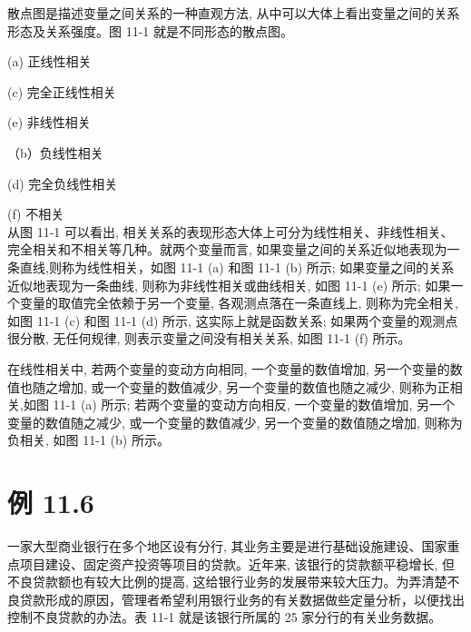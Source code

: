 \documentclass[10pt]{article}
\begin{document}
\begin{CJK*}{UTF8}{bsmi}
散点图是描述变量之间关系的一种直观方法, 从中可以大体上看出变量之间的关系形态及关系强度。图 11-1 就是不同形态的散点图。

\begin{center}
\end{center}

(a) 正线性相关

\begin{center}
\end{center}

(c) 完全正线性相关

\begin{center}
\end{center}

(e) 非线性相关

\begin{center}
\end{center}

（b）负线性相关

\begin{center}
\end{center}

(d) 完全负线性相关

\begin{center}
\end{center}

(f) 不相关\\
从图 11-1 可以看出, 相关关系的表现形态大体上可分为线性相关、非线性相关、完全相关和不相关等几种。就两个变量而言, 如果变量之间的关系近似地表现为一条直线,则称为线性相关，如图 11-1 (a) 和图 11-1 (b) 所示; 如果变量之间的关系近似地表现为一条曲线, 则称为非线性相关或曲线相关, 如图 11-1 (e) 所示; 如果一个变量的取值完全依赖于另一个变量, 各观测点落在一条直线上, 则称为完全相关, 如图 11-1 (c) 和图 11-1 (d) 所示, 这实际上就是函数关系; 如果两个变量的观测点很分散, 无任何规律, 则表示变量之间没有相关关系, 如图 11-1 (f) 所示。

在线性相关中, 若两个变量的变动方向相同, 一个变量的数值增加, 另一个变量的数值也随之增加, 或一个变量的数值减少, 另一个变量的数值也随之减少, 则称为正相关,如图 11-1 (a) 所示; 若两个变量的变动方向相反, 一个变量的数值增加, 另一个变量的数值随之减少, 或一个变量的数值减少, 另一个变量的数值随之增加, 则称为负相关, 如图 11-1 (b) 所示。

\section*{例 11.6}
一家大型商业银行在多个地区设有分行, 其业务主要是进行基础设施建设、国家重点项目建设、固定资产投资等项目的贷款。近年来, 该银行的贷款额平稳增长, 但不良贷款额也有较大比例的提高, 这给银行业务的发展带来较大压力。为弄清楚不良贷款形成的原因，管理者希望利用银行业务的有关数据做些定量分析，以便找出控制不良贷款的办法。表 11-1 就是该银行所属的 25 家分行的有关业务数据。


\end{CJK*}
\end{document}
